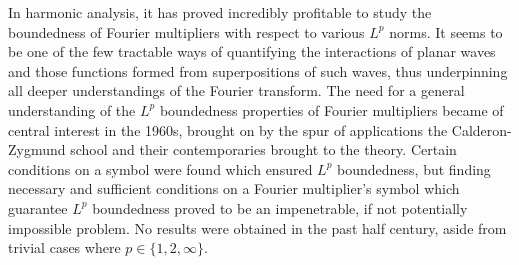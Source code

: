 \documentclass[11pt]{article}
\DeclareMathOperator{\RR}{\mathbb{R}}
\begin{document}
In harmonic analysis, it has proved incredibly profitable to study the boundedness of Fourier multipliers with respect to various $L^p$ norms. It seems to be one of the few tractable ways of quantifying the interactions of planar waves and those functions formed from superpositions of such waves, thus underpinning all deeper understandings of the Fourier transform. The need for a general understanding of the $L^p$ boundedness properties of Fourier multipliers became of central interest in the 1960s, brought on by the spur of applications the Calderon-Zygmund school and their contemporaries brought to the theory. Certain conditions on a symbol were found which ensured $L^p$ boundedness, but finding necessary and sufficient conditions on a Fourier multiplier's symbol which guarantee $L^p$ boundedness proved to be an impenetrable, if not potentially impossible problem. No results were obtained in the past half century, aside from trivial cases where $p \in \{ 1, 2, \infty \}$.
%
%
%
%
%
%
%
%
%
% 
%
%
%
%
\end{document}
